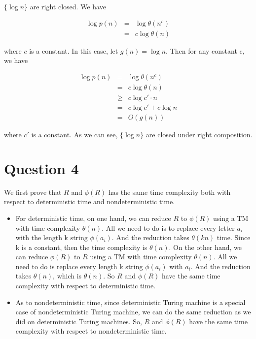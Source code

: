 \documentclass[12pt]{article}
\begin{document}
$\{\log {n} \}$ are right closed. We have

\begin{eqnarray*}
  \log {p(n)} &=& \log {\theta {(n^c)}} \\
  &=& c \log {\theta {(n)}}
\end{eqnarray*}

where $c$ is a constant. In this case, let $g(n) = \log {n}$. Then for
any constant c, we have

\begin{eqnarray*}
  \log {p(n)} &=& \log {\theta {(n^c)}} \\
  &=& c \log {\theta {(n)}} \\
  &\ge& c \log {c' \cdot n} \\
  &=& c \log c' + c \log n \\
  &=& O(g(n))
\end{eqnarray*}

where $c'$ is a constant. As we can see, $\{\log {n} \}$ are
closed under right composition.

\section*{Question 4}

We first prove that $R$ and $\phi(R)$ has the same time complexity
both with respect to deterministic time and nondeterministic time.

\begin{itemize}
\item For deterministic time, on one hand, we can reduce $R$ to
  $\phi(R)$ using a TM with time complexity $\theta (n)$. All we need
  to do is to replace every letter $a_i$ with the length k string
  $\phi(a_i)$. And the reduction takes $\theta (kn)$ time. Since k is
  a constant, then the time complexity is $\theta (n)$. On the other
  hand, we can reduce $\phi(R)$ to $R$ using a TM with time complexity
  $\theta (n)$. All we need to do is replace every length k string
  $\phi(a_i)$ with $a_i$. And the reduction takes $\theta(n)$, which
  is $\theta (n)$. So $R$ and $\phi(R)$ have the same time complexity
  with respect to deterministic time.
\item As to nondeterministic time, since deterministic Turing machine
  is a special case of nondeterministic Turing machine, we can do the
  same reduction as we did on deterministic Turing machines. So, $R$
  and $\phi(R)$ have the same time complexity with respect to
  nondeterministic time.
\end{itemize}
\end{document}
